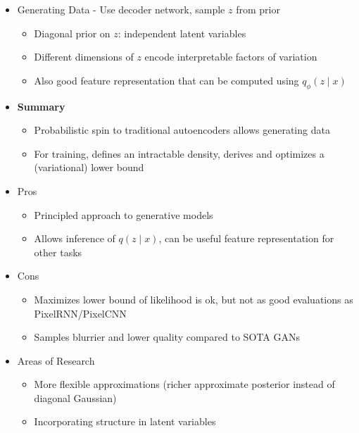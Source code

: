 \begin{itemize}
\begin{itemize}
	\end{itemize}
	\item Generating Data - Use decoder network, sample $z$ from prior
	\begin{itemize}
		\item Diagonal prior on $z$: independent latent variables
		\item Different dimensions of $z$ encode interpretable factors of variation
		\item Also good feature representation that can be computed using $q_\phi(z\mid x)$
	\end{itemize}
	\item \textbf{Summary}
	\begin{itemize}
		\item Probabilistic spin to traditional autoencoders allows generating data
		\item For training, defines an intractable density, derives and optimizes a (variational) lower bound
	\end{itemize}
	\item Pros
	\begin{itemize}
		\item Principled approach to generative models
		\item Allows inference of $q(z\mid x)$, can be useful feature representation for other tasks
	\end{itemize}
	\item Cons
	\begin{itemize}
		\item Maximizes lower bound of likelihood is ok, but not as good evaluations as PixelRNN/PixelCNN
		\item Samples blurrier and lower quality compared to SOTA GANs
	\end{itemize}
	\item Areas of Research
	\begin{itemize}
		\item More flexible approximations (richer approximate posterior instead of diagonal Gaussian)
		\item Incorporating structure in latent variables
	\end{itemize}
\end{itemize}

